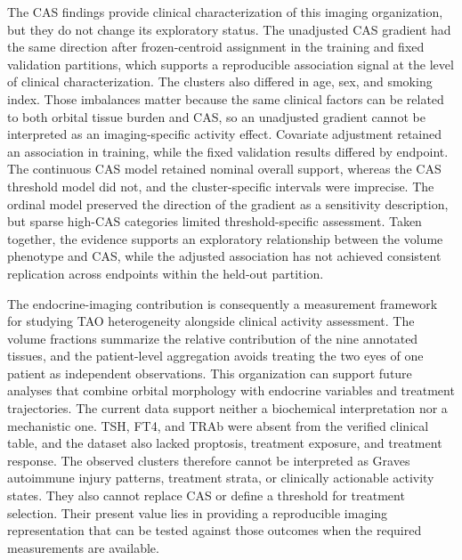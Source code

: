 \documentclass[utf8]{FrontiersinVancouver}
\begin{document}
The CAS findings provide clinical characterization of this imaging organization, but they do not change its exploratory status. The unadjusted CAS gradient had the same direction after frozen-centroid assignment in the training and fixed validation partitions, which supports a reproducible association signal at the level of clinical characterization. The clusters also differed in age, sex, and smoking index. Those imbalances matter because the same clinical factors can be related to both orbital tissue burden and CAS, so an unadjusted gradient cannot be interpreted as an imaging-specific activity effect. Covariate adjustment retained an association in training, while the fixed validation results differed by endpoint. The continuous CAS model retained nominal overall support, whereas the CAS threshold model did not, and the cluster-specific intervals were imprecise. The ordinal model preserved the direction of the gradient as a sensitivity description, but sparse high-CAS categories limited threshold-specific assessment. Taken together, the evidence supports an exploratory relationship between the volume phenotype and CAS, while the adjusted association has not achieved consistent replication across endpoints within the held-out partition.

The endocrine-imaging contribution is consequently a measurement framework for studying TAO heterogeneity alongside clinical activity assessment. The volume fractions summarize the relative contribution of the nine annotated tissues, and the patient-level aggregation avoids treating the two eyes of one patient as independent observations. This organization can support future analyses that combine orbital morphology with endocrine variables and treatment trajectories. The current data support neither a biochemical interpretation nor a mechanistic one. TSH, FT4, and TRAb were absent from the verified clinical table, and the dataset also lacked proptosis, treatment exposure, and treatment response. The observed clusters therefore cannot be interpreted as Graves autoimmune injury patterns, treatment strata, or clinically actionable activity states. They also cannot replace CAS or define a threshold for treatment selection. Their present value lies in providing a reproducible imaging representation that can be tested against those outcomes when the required measurements are available.
\end{document}
